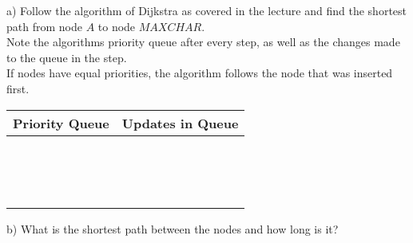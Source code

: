 a) Follow the algorithm of Dijkstra as covered in the lecture and find the shortest path from node $A$ to node $MAXCHAR$.\\
Note the algorithms priority queue after every step, as well as the changes made to the queue in the step.\\
If nodes have equal priorities, the algorithm follows the node that was inserted first.\\
\newpage
\begin{center}
    \begin{tabular}{|P{8cm}|P{6cm}|}
        \hline
        Priority Queue & Updates in Queue\\
        \hline
        \hline
        &\\[1.5ex]
        \hline
        &\\[1.5ex]
        \hline
        &\\[1.5ex]
        \hline
        &\\[1.5ex]
        \hline
        &\\[1.5ex]
        \hline
        &\\[1.5ex]
        \hline
        &\\[1.5ex]
        \hline
        &\\[1.5ex]
        \hline
        &\\[1.5ex]
        \hline
        &\\[1.5ex]
        \hline
        &\\[1.5ex]
        \hline
        &\\[1.5ex]
        \hline
        &\\[1.5ex]
        \hline
        &\\[1.5ex]
        \hline
        &\\[1.5ex]
        \hline
    \end{tabular}
\end{center}
b) What is the shortest path between the nodes and how long is it?\\
\begin{center}
    \noindent{}
\end{center}
